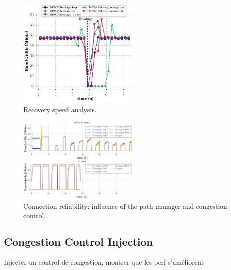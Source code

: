 \begin{figure}[!t]
  \begin{center}
    \includegraphics[width=6cm]{figures/breakage_analysis.png}
  \end{center}
  \caption{Recovery speed analysis.}
\end{figure}


\begin{figure}[!t]
  \begin{center}
    \includegraphics[width=6cm]{figures/tcpls_mptcp.png}
  \end{center}
  \caption{Connection reliability: influence of the path manager and congestion
  control.}
\end{figure}



\subsection{Congestion Control Injection}

Injecter un control de congestion, montrer que les perf s'améliorent
